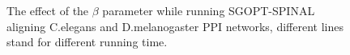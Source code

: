 \documentclass{bioinfo}
\theoremstyle{definition}
\begin{document}
\begin{figure}[!htbp]
    \caption{The effect of the $\beta$ parameter while running SGOPT-SPINAL aligning C.elegans and D.melanogaster PPI networks, different lines stand for different running time. }
    \label{beta}
\end{figure}
\end{document}
